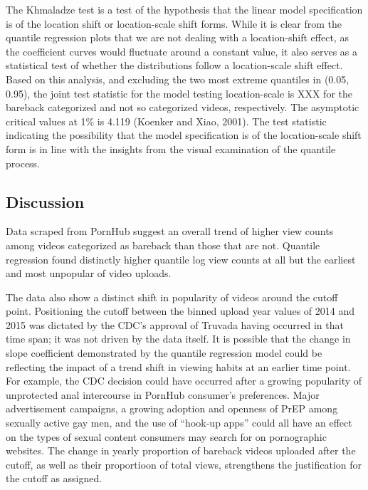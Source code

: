 \documentclass[]{article}
\begin{document}
The Khmaladze test is a test of the hypothesis that the linear model
specification is of the location shift or location-scale shift forms.
While it is clear from the quantile regression plots that we are not
dealing with a location-shift effect, as the coefficient curves would
fluctuate around a constant value, it also serves as a statistical test
of whether the distributions follow a location-scale shift effect. Based
on this analysis, and excluding the two most extreme quantiles in (0.05,
0.95), the joint test statistic for the model testing location-scale is
XXX for the bareback categorized and not so categorized videos,
respectively. The asymptotic critical values at 1\% is 4.119 (Koenker
and Xiao, 2001). The test statistic indicating the possibility that the
model specification is of the location-scale shift form is in line with
the insights from the visual examination of the quantile process.

\subsection{Discussion}\label{discussion}

Data scraped from PornHub suggest an overall trend of higher view counts
among videos categorized as bareback than those that are not. Quantile
regression found distinctly higher quantile log view counts at all but
the earliest and most unpopular of video uploads.

The data also show a distinct shift in popularity of videos around the
cutoff point. Positioning the cutoff between the binned upload year
values of 2014 and 2015 was dictated by the CDC's approval of Truvada
having occurred in that time span; it was not driven by the data itself.
It is possible that the change in slope coefficient demonstrated by the
quantile regression model could be reflecting the impact of a trend
shift in viewing habits at an earlier time point. For example, the CDC
decision could have occurred after a growing popularity of unprotected
anal intercourse in PornHub consumer's preferences. Major advertisement
campaigns, a growing adoption and openness of PrEP among sexually active
gay men, and the use of ``hook-up apps'' could all have an effect on the
types of sexual content consumers may search for on pornographic
websites. The change in yearly proportion of bareback videos uploaded
after the cutoff, as well as their proportioon of total views,
strengthens the justification for the cutoff as assigned.
\end{document}
